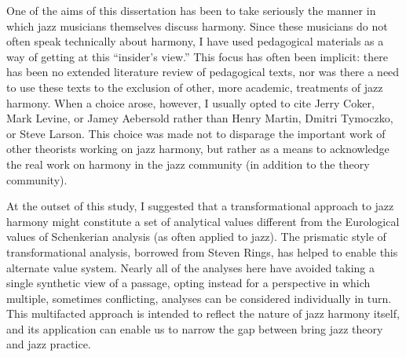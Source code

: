 One of the aims of this dissertation has been to take seriously the manner in
which jazz musicians themselves discuss harmony. Since these musicians do not
often speak technically about harmony, I have used pedagogical materials as a
way of getting at this ``insider's view.'' This focus has often been implicit:
there has been no extended literature review of pedagogical texts, nor was
there a need to use these texts to the exclusion of other, more academic,
treatments of jazz harmony. When a choice arose, however, I usually opted to
cite Jerry Coker, Mark Levine, or Jamey Aebersold rather than Henry Martin,
Dmitri Tymoczko, or Steve Larson. This choice was made not to disparage the
important work of other theorists working on jazz harmony, but rather as a
means to acknowledge the real work on harmony in the jazz community (in
addition to the theory community).

At the outset of this study, I suggested that a transformational approach to
jazz harmony might constitute a set of analytical values different from the
Eurological values of Schenkerian analysis (as often applied to jazz). The
prismatic style of transformational analysis, borrowed from Steven Rings, has
helped to enable this alternate value system. Nearly all of the analyses here
have avoided taking a single synthetic view of a passage, opting instead for a
perspective in which multiple, sometimes conflicting, analyses can be
considered individually in turn. This multifacted approach is intended to
reflect the nature of jazz harmony itself, and its application can enable us
to narrow the gap between bring jazz theory and jazz practice.


